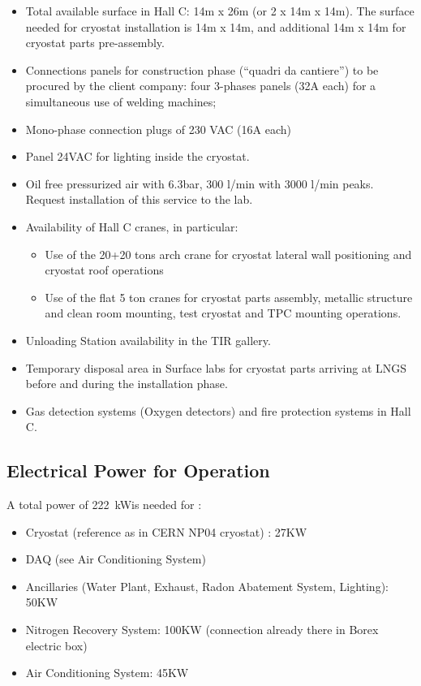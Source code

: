 \begin{itemize}

\item Total available surface in Hall C: 14m x 26m (or 2 x 14m x 14m). The surface needed for cryostat installation is 14m x 14m, and additional 14m x 14m for cryostat parts pre-assembly. 
\item Connections panels for construction phase (“quadri da cantiere”) to be procured by the client company: four 3-phases panels (32A each) for a simultaneous use of welding machines;
\item Mono-phase connection plugs of 230 VAC (16A each)
\item Panel 24VAC for lighting inside the cryostat.
\item Oil free pressurized air with 6.3bar, 300 l/min with 3000 l/min peaks. Request installation of this service to the lab.
\item Availability of Hall C cranes, in particular:
\begin{itemize}[label=-]
\item Use of the 20+20 tons arch crane for cryostat lateral wall positioning and cryostat roof operations
\item Use of the flat 5 ton cranes for cryostat parts assembly, metallic structure and clean room mounting, test cryostat and TPC mounting operations.
\end{itemize}
\item Unloading Station availability in the TIR gallery.
\item Temporary disposal area in Surface labs for cryostat parts arriving at LNGS before and during the installation phase. 
\item Gas detection systems (Oxygen detectors) and fire protection systems in Hall C.
\end{itemize}

\subsection{Electrical Power for \DSks Operation}
\label{sec:ElectricalPower}

\newcommand{\TotalPowerConsumption}{\SI{222}{\kW}}
\newcommand{\TotalUPSPowerConsumption}{\SI{85}{\kW}}

A total power of \TotalPowerConsumption is needed for \DSks:

\begin{itemize}
\item Cryostat (reference as in CERN NP04 cryostat) : 27KW 
\item DAQ (see Air Conditioning System) 
\item Ancillaries (Water Plant, Exhaust, Radon Abatement System, Lighting): 50KW 
\item Nitrogen Recovery System: 100KW (connection already there in Borex electric box)
\item Air Conditioning System: 45KW 
\end{itemize}
\vspace{\baselineskip}

